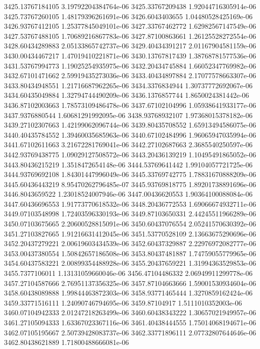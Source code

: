 {3425.13767184105 3.19792204384764e-06
3425.33767209438 1.92044716305914e-06
3425.73767260105 1.48179396261691e-06
3426.6043403655 1.04480528425169e-06
3426.93767412105 1.25377845049101e-06
3427.33767462772 1.62982567147549e-06
3427.53767488105 1.70689216867783e-06
3427.87100863661 1.26125528272554e-06
3428.60434289883 2.05133865742737e-06
3429.40434391217 2.01167904581159e-06
3430.00434467217 1.47019410221871e-06
3430.13767817439 1.38768781577536e-06
3431.53767994773 1.19025254935975e-06
3432.20434745884 1.66052347769982e-06
3432.67101471662 2.59919435273036e-06
3433.40434897884 2.17077578663307e-06
3433.80434948551 1.21716687962265e-06
3434.3376834944 1.30737772692067e-06
3434.60435049884 1.32794744490209e-06
3436.1376857744 1.8650024381442e-06
3436.87102003663 1.78573109486478e-06
3437.67102104996 1.05938641933177e-06
3437.9376880544 1.60681291992095e-06
3438.93768932107 1.97368015378182e-06
3439.27102307663 1.42199062096744e-06
3439.80435708552 1.65913494586075e-06
3440.40435784552 1.39460035685963e-06
3440.67102484996 1.96065947035994e-06
3441.67102611663 3.21672281769041e-06
3442.27102687663 2.3685540250597e-06
3442.93769438775 1.09029127508572e-06
3443.20436139219 1.10495491865052e-06
3443.80436215219 1.3518472654148e-06
3444.53769641442 1.99104057721725e-06
3444.93769692108 1.84301447996049e-06
3445.33769742775 1.78831670888209e-06
3445.60436443219 8.95470262796485e-07
3445.93769818775 1.89201738891696e-06
3446.8043659522 1.23018524007946e-06
3447.00436620553 1.90364100088084e-06
3447.60436696553 1.91773770618532e-06
3448.20436772553 1.69066674932711e-06
3449.07103548998 1.72403596330193e-06
3449.87103650331 2.44245511966289e-06
3450.07103675665 2.20600528815091e-06
3450.60437076554 2.05241570630392e-06
3451.27103827665 1.91216631412045e-06
3451.53770528109 2.13663675290696e-06
3452.20437279221 2.00619603434539e-06
3452.60437329887 2.22976972082777e-06
3453.00437380554 1.50842657186508e-06
3453.80437481887 1.74759055779965e-06
3454.60437583221 2.00899354488928e-06
3455.20437659221 1.31994363529853e-06
3455.7377106011 1.13131059660046e-06
3456.47104486332 2.06949911299778e-06
3457.27104587666 2.76951137356325e-06
3457.87104663666 1.59001530934604e-06
3458.60438089888 1.99844463872303e-06
3458.93771465444 1.3270859162424e-06
3459.33771516111 1.24090746794695e-06
3459.87104917 1.5111010352003e-06
3460.07104942333 2.01247218263499e-06
3460.60438343222 1.30657021949957e-06
3461.27105094333 1.63367023367116e-06
3461.40438444555 1.75014068194671e-06
3462.07105195667 2.50739428083737e-06
3462.33771896111 2.07732807644646e-06
3462.80438621889 1.71800488666081e-06
}
